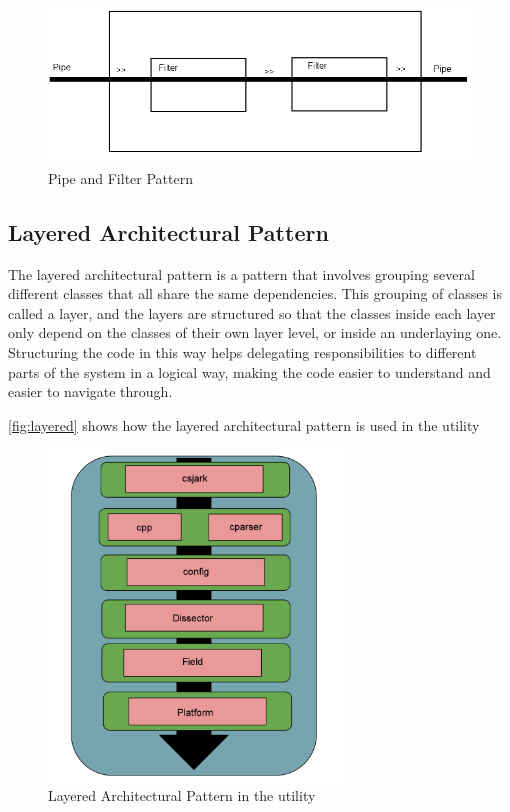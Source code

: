 \begin{figure}[htb]
	\includegraphics[width=\textwidth]{./planning/img/PipeAndFilter}
	\caption{Pipe and Filter Pattern\label{fig:pipefilter}}
\end{figure}

\subsection{Layered Architectural Pattern}
\label{sec:Layered}
The layered architectural pattern is a pattern that involves grouping several different classes that all share the same dependencies. This grouping of classes is called a layer, and the layers are structured so that the classes inside each layer only depend on the classes of their own layer level, or inside an underlaying one. Structuring the code in this way helps delegating responsibilities to different parts of the system in a logical way, making the code easier to understand and easier to navigate through.

\autoref{fig:layered} shows how the layered architectural pattern is used in the \gls{utility}

\begin{figure}[htb]
	\center
	\includegraphics[width=0.7\textwidth]{./planning/img/layered}
	\caption{Layered Architectural Pattern in the \gls{utility}\label{fig:layered}}
\end{figure}


